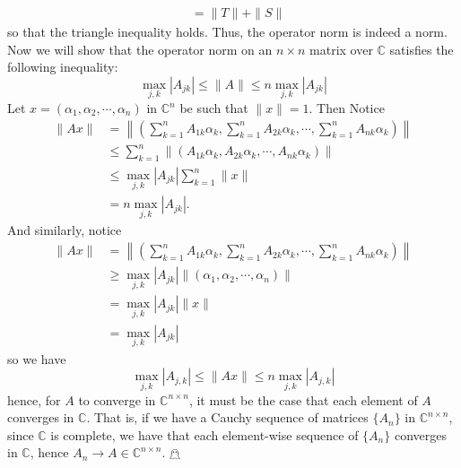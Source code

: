 \documentclass{article}
\begin{document}
\begin{itemize}
\begin{align*}
        &= \|T\| + \|S\|
    \end{align*}
    so that the triangle inequality holds. Thus, the operator norm is indeed a norm.
    \newline\newline
    Now we will show that the operator norm on an $n \times n$ matrix over $\mathbb{C}$ satisfies the following inequality:
    \[\max_{j,k} |A_{jk}| \leq \|A\| \leq n\max_{j,k}|A_{jk}|\]
    Let $x =(\alpha_1, \alpha_2, \cdots, \alpha_n)$ in $\mathbb{C}^n$ be such that $\|x\| = 1$. Then Notice
    \begin{align*}
        \|Ax\| &= \left\| \left(\sum_{k=1}^n A_{1k}\alpha_k, \sum_{k=1}^n A_{2k} \alpha_k, \cdots, \sum_{k=1}^n A_{nk}\alpha_k\right) \right\|\\
        &\leq \sum_{k=1}^n \left\|(A_{1k}\alpha_k, A_{2k}\alpha_k, \cdots, A_{nk}\alpha_k)\right\|\\
        &\leq \max_{j,k}|A_{jk}| \sum_{k=1}^n \|x\|\\
        &= n\max_{j,k} |A_{jk}|.
    \end{align*}
    And similarly, notice
    \begin{align*}
        \|Ax\| &= \left\| \left(\sum_{k=1}^n A_{1k}\alpha_k, \sum_{k=1}^n A_{2k} \alpha_k, \cdots, \sum_{k=1}^n A_{nk}\alpha_k\right) \right\|\\
        &\geq \max_{j,k}|A_{jk}|\|(\alpha_1, \alpha_2, \cdots, \alpha_n)\|\\
        &= \max_{j,k}|A_{jk}|\|x\|\\
        &= \max_{j,k}|A_{jk}|
    \end{align*}
    so we have
    \[\max_{j,k}|A_{j,k}| \leq \|Ax\| \leq n\max_{j,k}|A_{j,k}|\]
    hence, for $A$ to converge in $\mathbb{C}^{n\times n}$, it must be the case that each element of $A$ converges in $\mathbb{C}$. That is, if we have a Cauchy sequence of matrices $\{A_n\}$ in $\mathbb{C}^{n\times n}$, since $\mathbb{C}$ is complete, we have that each element-wise sequence of $\{A_n\}$ converges in $\mathbb{C}$, hence $A_n \to A \in \mathbb{C}^{n \times n}$. \hfill $\mathghost$
   
    
    

\end{itemize}
\end{document}
